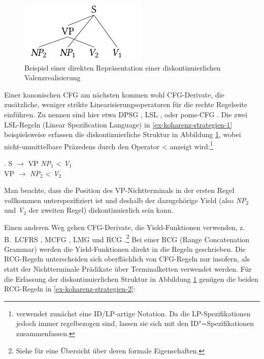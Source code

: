 \begin{figure}[t]
\centering
\includegraphics{graphics/abb63.pdf}
\caption{\label{fig-ttmctag-kohaerenz-2}Beispiel einer direkten Repräsentation einer diskontinuierlichen Valenzrealisierung}
\end{figure}

\largerpage
Einer kanonischen CFG am nächsten kommen wohl CFG-Derivate, die zusätzliche, weniger strikte Linearisierungsoperatoren für die rechte Regelseite einführen. Zu nennen sind hier etwa DPSG \citep{Bunt:etal:87}, LSL \citep{Suhre:99}, oder poms-CFG \citep{Nederhof:etal:03}. Die zwei LSL-Regeln (Linear Spezification Language) in \ref{ex-koharenz-strategien-1} beispielsweise erfassen die diskontinuierliche Struktur in Abbildung \ref{fig-ttmctag-kohaerenz-2}, wobei nicht-unmittelbare Präzedens durch den Operator < anzeigt wird:\footnote{\cite{Suhre:99} verwendet zunächst eine ID/LP-artige Notation. Da die LP-Spezifikationen jedoch immer regelbezogen sind, lassen sie sich mit den ID"=Spezifikationen zusammenfassen.}  

\ex. \label{ex-koharenz-strategien-1}
S $\to$ VP {\it NP$_1$} < {\it V$_1$} \\
VP $\to$ {\it NP$_2$} < {\it V$_2$}

Man beachte, dass die Position des VP-Nichtterminals in der ersten Regel vollkommen unterspezifiziert ist und deshalb der dazugehörige Yield (also {\it NP$_2$} und {\it V$_2$} der zweiten Regel) diskontinuierlich sein kann.
	
Einen anderen Weg gehen CFG-Derivate, die Yield-Funktionen verwenden, z.\,B.\ LCFRS \citep{Vijay-Shanker:etal:87,Weir:88}, MCFG \citep{Seki:etal:91}, LMG \citep{Groenink:95} und RCG \citep{Boullier:00}.\footnote{Siehe \citet[Abschnitt~2.2]{Kallmeyer:10} für eine Übersicht über deren formale Eigenschaften.} Bei einer RCG (Range Concatenation Grammar) werden die Yield-Funktionen direkt in die Regeln geschrieben. Die RCG-Regeln unterscheiden sich oberflächlich von CFG-Regeln nur insofern, als statt der Nichtterminale Prädikate über Terminalketten verwendet werden. Für die Erfassung der diskontinuierlichen Struktur in Abbildung \ref{fig-ttmctag-kohaerenz-2} genügen die beiden RCG-Regeln in \ref{ex-koharenz-strategien-2}:  

